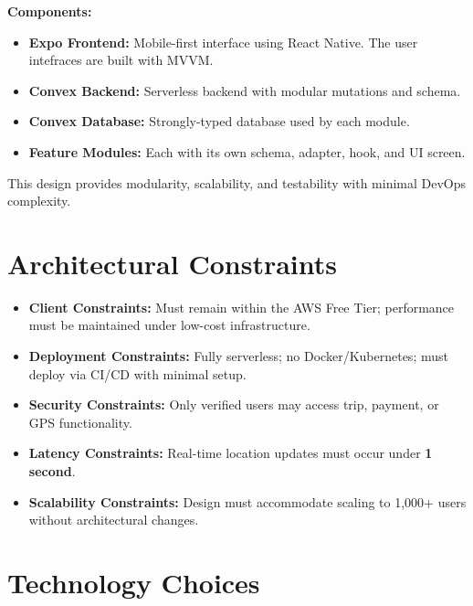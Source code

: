 \documentclass[12pt]{article}
\begin{document}
\vspace{1em}
\vspace{1em}

\textbf{Components:}

\begin{itemize}
  \item \textbf{Expo Frontend:} Mobile-first interface using React Native. The user intefraces are built with MVVM.
  \item \textbf{Convex Backend:} Serverless backend with modular mutations and schema.
  \item \textbf{Convex Database:} Strongly-typed database used by each module.
  \item \textbf{Feature Modules:} Each with its own schema, adapter, hook, and UI screen.
\end{itemize}

This design provides modularity, scalability, and testability with minimal DevOps complexity.

\section{Architectural Constraints}
\begin{itemize}
  \item \textbf{Client Constraints:} Must remain within the AWS Free Tier; performance must be maintained under low-cost infrastructure.
  \item \textbf{Deployment Constraints:} Fully serverless; no Docker/Kubernetes; must deploy via CI/CD with minimal setup.
  \item \textbf{Security Constraints:} Only verified users may access trip, payment, or GPS functionality.
  \item \textbf{Latency Constraints:} Real-time location updates must occur under \textbf{1 second}.
  \item \textbf{Scalability Constraints:} Design must accommodate scaling to 1,000+ users without architectural changes.
\end{itemize}

\section{Technology Choices}
\end{document}
